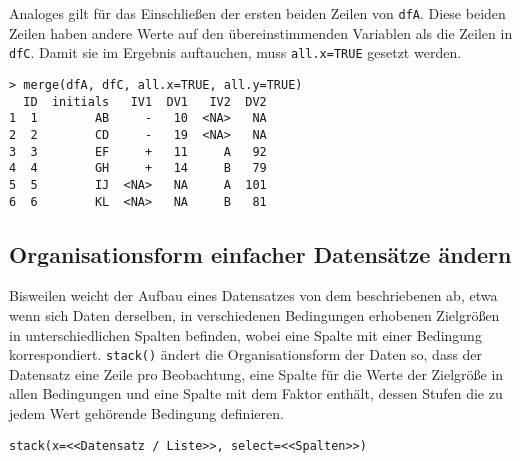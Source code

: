 Analoges gilt für das Einschließen der ersten beiden Zeilen von \lstinline!dfA!. Diese beiden Zeilen haben andere Werte auf den übereinstimmenden Variablen als die Zeilen in \lstinline!dfC!\@. Damit sie im Ergebnis auftauchen, muss \lstinline!all.x=TRUE! gesetzt werden.
\begin{lstlisting}
> merge(dfA, dfC, all.x=TRUE, all.y=TRUE)
  ID  initials   IV1  DV1   IV2  DV2
1  1        AB     -   10  <NA>   NA
2  2        CD     -   19  <NA>   NA
3  3        EF     +   11     A   92
4  4        GH     +   14     B   79
5  5        IJ  <NA>   NA     A  101
6  6        KL  <NA>   NA     B   81
\end{lstlisting}

\subsection{Organisationsform einfacher Datensätze ändern}
\label{sec:stack}

Bisweilen weicht der Aufbau eines Datensatzes von dem beschriebenen ab, etwa wenn sich Daten derselben, in verschiedenen Bedingungen erhobenen Zielgrößen in unterschiedlichen Spalten befinden, wobei eine Spalte mit einer Bedingung korrespondiert. \lstinline!stack()! ändert die Organisationsform der Daten so, dass der Datensatz eine Zeile pro Beobachtung, eine Spalte für die Werte der Zielgröße in allen Bedingungen und eine Spalte mit dem Faktor enthält, dessen Stufen die zu jedem Wert gehörende Bedingung definieren.
\begin{lstlisting}
stack(x=<<Datensatz / Liste>>, select=<<Spalten>>)
\end{lstlisting}

